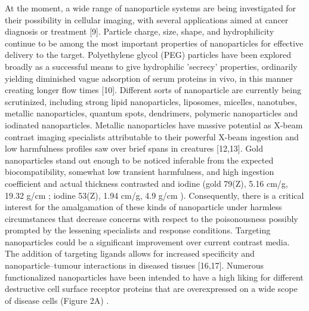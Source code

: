\documentclass[12pt]{article}
\begin{document}
At the moment, a wide range of nanoparticle systems are being investigated for their possibility in cellular imaging, with several applications aimed at cancer diagnosis or treatment [9]. Particle charge, size, shape, and hydrophilicity continue to be among the most important properties of nanoparticles for effective delivery to the target. Polyethylene glycol (PEG) particles have been explored broadly as a successful means to give hydrophilic 'secrecy' properties, ordinarily yielding diminished vague adsorption of serum proteins in vivo, in this manner creating longer flow times [10]. Different sorts of nanoparticle are currently being scrutinized, including strong lipid nanoparticles, liposomes, micelles, nanotubes, metallic nanoparticles, quantum spots, dendrimers, polymeric nanoparticles and iodinated nanoparticles. Metallic nanoparticles have massive potential as X-beam contrast imaging specialists attributable to their powerful X-beam ingestion and low harmfulness profiles saw over brief spans in creatures [12,13]. Gold nanoparticles stand out enough to be noticed inferable from the expected biocompatibility, somewhat low transient harmfulness, and high ingestion coefficient and actual thickness contrasted and iodine (gold 79(Z), 5.16 cm/g, 19.32 g/cm ; iodine 53(Z), 1.94 cm/g, 4.9 g/cm ). Consequently, there is a critical interest for the amalgamation of these kinds of nanoparticle under harmless circumstances that decrease concerns with respect to the poisonousness possibly prompted by the lessening specialists and response conditions. Targeting nanoparticles could be a significant improvement over current contrast media. The addition of targeting ligands allows for increased specificity and nanoparticle–tumour interactions in diseased tissues [16,17]. Numerous functionalized nanoparticles have been intended to have a high liking for different destructive cell surface receptor proteins that are overexpressed on a wide scope of disease cells (Figure 2A) .\\
\end{document}
